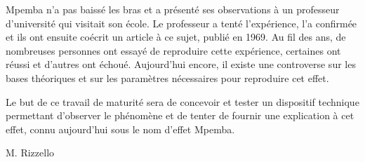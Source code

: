 \documentclass[
  10pt,
  french,
  a5paper,
  openany]{book}
\newenvironment{signature}{\begin{flushright}}{\end{flushright}}
\begin{document}
Mpemba n'a pas baissé les bras et a présenté ses observations à un professeur d'université qui visitait son école. Le professeur a tenté l'expérience, l'a confirmée et ils ont ensuite coécrit un article à ce sujet, publié en 1969. Au fil des ans, de nombreuses personnes ont essayé de reproduire cette expérience, certaines ont réussi et d'autres ont échoué. Aujourd'hui encore, il existe une controverse sur les bases théoriques et sur les paramètres nécessaires pour reproduire cet effet.

Le but de ce travail de maturité sera de concevoir et tester un dispositif technique permettant d'observer le phénomène et de tenter de fournir une explication à cet effet, connu aujourd'hui sous le nom d'effet Mpemba.

\begin{signature}
M. Rizzello

\end{signature}
\end{document}

